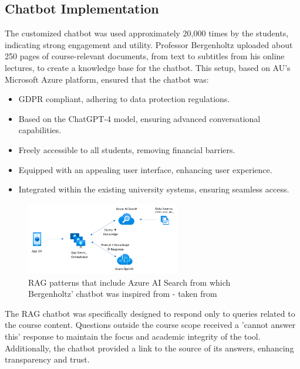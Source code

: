     \subsection*{Chatbot Implementation}

    The customized chatbot was used approximately 20,000 times by the students, indicating strong engagement and utility. Professor Bergenholtz uploaded about 250 pages of course-relevant documents, from text to subtitles from his online lectures, to create a knowledge base for the chatbot. This setup, based on AU's Microsoft Azure platform, ensured that the chatbot was:

    \begin{itemize}
        \item GDPR compliant, adhering to data protection regulations.
        \item Based on the ChatGPT-4 model, ensuring advanced conversational capabilities.
        \item Freely accessible to all students, removing financial barriers.
        \item Equipped with an appealing user interface, enhancing user experience.
        \item Integrated within the existing university systems, ensuring seamless access.
    \end{itemize}
    \begin{figure}[H]
        \centering
        \includegraphics[width=0.6\textwidth]{figs/appcomponents.png}
        \caption{RAG patterns that include Azure AI Search from which Bergenholtz' chatbot was inspired from - taken from \cite{microsoft}}
        \label{fig:CLAI_Poster_Competition}
    \end{figure}

    The RAG chatbot was specifically designed to respond only to queries related to the course content. Questions outside the course scope received a 'cannot answer this' response to maintain the focus and academic integrity of the tool. Additionally, the chatbot provided a link to the source of its answers, enhancing transparency and trust.

